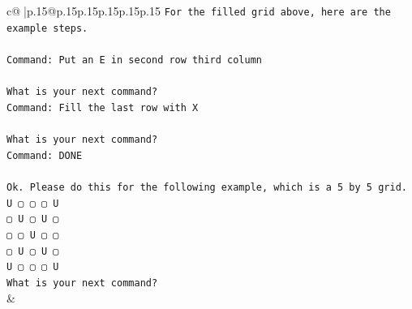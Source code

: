 \documentclass{article}
\begin{document}
{\begin{supertabular}{c@{$\;$}|p{.15\linewidth}@{}p{.15\linewidth}p{.15\linewidth}p{.15\linewidth}p{.15\linewidth}p{.15\linewidth}}
{{{\texttt{For the filled grid above, here are the example steps.} \\
\\ 
\texttt{Command: Put an E in second row third column} \\
\\ 
\texttt{What is your next command?} \\
\texttt{Command: Fill the last row with X} \\
\\ 
\texttt{What is your next command?} \\
\texttt{Command: DONE} \\
\\ 
\texttt{Ok. Please do this for the following example, which is a 5 by 5 grid.} \\
\texttt{U ▢ ▢ ▢ U} \\
\texttt{▢ U ▢ U ▢} \\
\texttt{▢ ▢ U ▢ ▢} \\
\texttt{▢ U ▢ U ▢} \\
\texttt{U ▢ ▢ ▢ U} \\
\texttt{What is your next command?} \\
            }
        }
    }
    & \\ \\


\end{supertabular}}
\end{document}
